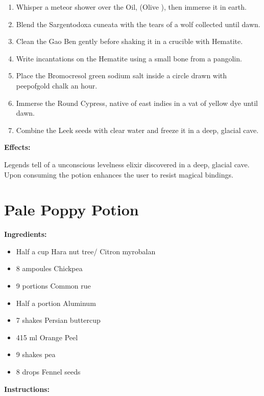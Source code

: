 \documentclass{article}
\begin{document}
\begin{enumerate}
  \item Whisper a meteor shower over the Oil, (Olive ), then immerse it in earth.
  \item Blend the Sargentodoxa cuneata with the tears of a wolf collected until dawn.
  \item Clean the Gao Ben gently before shaking it in a crucible with Hematite.
  \item Write incantations on the Hematite using a small bone from a pangolin.
  \item Place the Bromocresol green sodium salt inside a circle drawn with peepofgold chalk an hour.
  \item Immerse the Round Cypress, native of east indies in a vat of yellow dye until dawn.
  \item Combine the Leek seeds with clear water and freeze it in a deep, glacial cave.
\end{enumerate}

\textbf{Effects:}

Legends tell of a unconscious levelness elixir discovered in a deep, glacial cave. Upon consuming the potion enhances the user to resist magical bindings.

\newpage
\section*{Pale Poppy Potion}

\textbf{Ingredients:}

\begin{itemize}
  \item Half a cup Hara nut tree/ Citron myrobalan
  \item 8 ampoules Chickpea
  \item 9 portions Common rue
  \item Half a portion Aluminum
  \item 7 shakes Persian buttercup
  \item 415 ml Orange Peel
  \item 9 shakes pea
  \item 8 drops Fennel seeds
\end{itemize}

\textbf{Instructions:}
\end{document}
